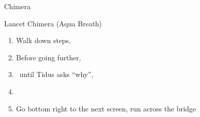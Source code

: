 \begin{battle}{Chimera}
	\begin{itemize}
		\kimahrif Lancet Chimera (Aqua Breath)
		\kimahrif \od\ \stonebreath
	\end{itemize}
\end{battle}
\winvfill
\begin{enumerate}[resume]
	\item Walk down steps, \cs[1:30]
	\item Before going further, 
	\item \sd\ until Tidus asks ``why'', \cs[6:20]
	\item \formation{\tidus}{\rikku}{\kimahri}
	\item Go bottom right to the next screen, run across the bridge
\end{enumerate}